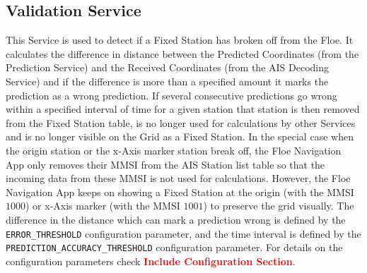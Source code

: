 \subsection{Validation Service}
\label{sec:sec5_2_7}
\noindent
%	
This Service is used to detect if a Fixed Station has broken off from the Floe. It calculates the difference in distance between the Predicted Coordinates (from the Prediction Service) and the Received Coordinates (from the AIS Decoding Service) and if the difference is more than a specified amount it marks the prediction as a wrong prediction. If several consecutive predictions go wrong within a specified interval of time for a given station that station is then removed from the Fixed Station table, is no longer used for calculations by other Services and is no longer visible on the Grid as a Fixed Station. 
In the special case when the origin station or the x-Axis marker station break off, the Floe Navigation App only removes their MMSI from the AIS Station list table so that the incoming data from these MMSI is not used for calculations. However, the Floe Navigation App keeps on showing a Fixed Station at the origin (with the MMSI $1000$) or x-Axis marker (with the MMSI $1001$) to preserve the grid visually. 
The difference in the distance which can mark a prediction wrong is defined by the \verb|ERROR_THRESHOLD| configuration parameter, and the time interval is defined by the \verb|PREDICTION_ACCURACY_THRESHOLD| configuration parameter. For details on the configuration parameters check \textbf{\textcolor{red}{Include Configuration Section}}.




